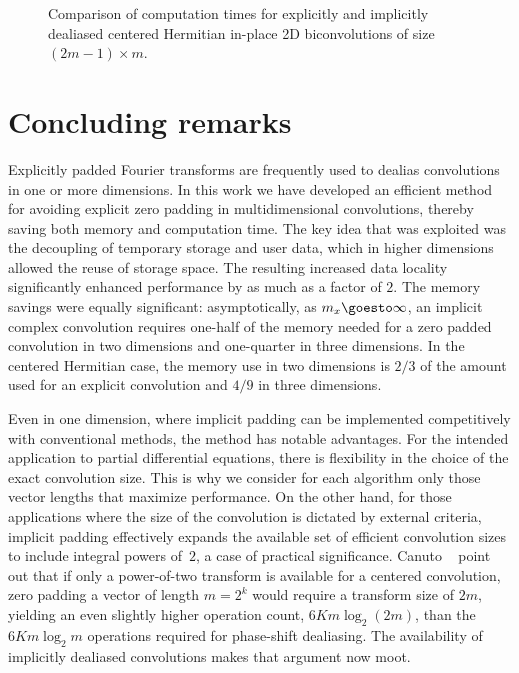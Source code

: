 \documentclass[final]{siamltex}
\begin{document}
\begin{figure}[htbp]
\begin{minipage}{0.48\linewidth}
\begin{center}
\caption{Comparison of computation times for explicitly and implicitly
dealiased centered Hermitian in-place 2D biconvolutions of size $(2m-1)\times m$.}
\label{timing2b}
\end{center}
\end{minipage}
\end{figure}

\section{Concluding remarks}
Explicitly padded Fourier transforms are frequently used to dealias
convolutions in one or more dimensions.
In this work we have developed an efficient method for avoiding explicit zero
padding in multidimensional convolutions, thereby saving both memory and
computation time. The key idea that was exploited was the decoupling
of temporary storage and user data, which in higher dimensions allowed
the reuse of storage space. The resulting increased data locality
significantly enhanced performance by as much as a factor of $2$.
The memory savings were equally significant: asymptotically, as
$m_x\goesto\infty$, an implicit complex convolution requires one-half of
the memory needed for a zero padded convolution in two dimensions and
one-quarter in three dimensions. In the centered Hermitian case, the memory
use in two dimensions is $2/3$ of the amount used for an explicit
convolution and $4/9$ in three dimensions. 

Even in one dimension, where implicit padding can be implemented
competitively with conventional methods, the method has notable advantages.
For the intended application to partial differential
equations, there is flexibility in the choice of the exact convolution
size. This is why we consider for each algorithm only those vector lengths
that maximize performance.
On the other hand, for those applications where the size of the convolution
is dictated by external criteria, implicit padding effectively expands the
available set of efficient convolution sizes to include integral powers
of~$2$, a case of practical significance.
Canuto \etal\ \cite[p.136]{Canuto06} point out that if only a
power-of-two transform is available for a centered convolution, zero
padding a vector of length $m=2^k$  would require a transform size of $2m$,
yielding an even slightly higher operation count, $6Km\log_2(2m)$, than the $6K
m\log_2m$ operations required for phase-shift dealiasing. The availability
of implicitly dealiased convolutions makes that argument now moot.
\end{document}
